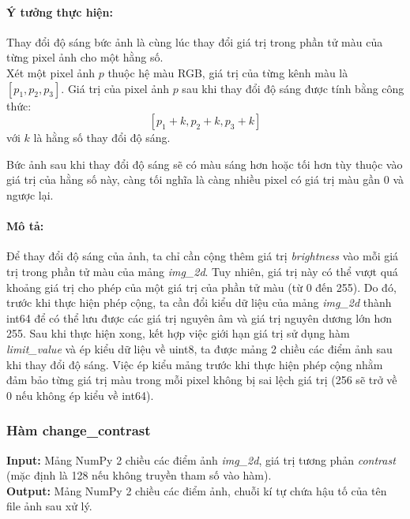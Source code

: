 \documentclass{article}
\begin{document}
\paragraph{Ý tưởng thực hiện:} Thay đổi độ sáng bức ảnh là cùng lúc thay đổi giá trị trong phần tử màu của từng pixel ảnh cho một hằng số. \\
Xét một pixel ảnh $p$ thuộc hệ màu RGB, giá trị của từng kênh màu là $[p_{1}, p_{2}, p_{3}]$. Giá trị của pixel ảnh $p$ sau khi thay đổi độ sáng được tính bằng công thức: 
\[[p_{1} + k , p_{2} + k, p_{3} + k]\]
với $k$ là hằng số thay đổi độ sáng. \par Bức ảnh sau khi thay đổi độ sáng sẽ có màu sáng hơn hoặc tối hơn tùy thuộc vào giá trị của hằng số này, càng tối nghĩa là càng nhiều pixel có giá trị màu gần 0 và ngược lại.

\paragraph{Mô tả:} Để thay đổi độ sáng của ảnh, ta chỉ cần cộng thêm giá trị \textit{brightness} vào mỗi giá trị trong phần tử màu của mảng \textit{img\_2d}. Tuy nhiên, giá trị này có thể vượt quá khoảng giá trị cho phép của một giá trị của phần tử màu (từ 0 đến 255). Do đó, trước khi thực hiện phép cộng, ta cần đổi kiểu dữ liệu của mảng \textit{img\_2d} thành int64 để có thể lưu được các giá trị nguyên âm và giá trị nguyên dương lớn hơn 255. Sau khi thực hiện xong, kết hợp việc giới hạn giá trị sử dụng hàm \textit{limit\_value} và ép kiểu dữ liệu về uint8, ta được mảng 2 chiều các điểm ảnh sau khi thay đổi độ sáng. Việc ép kiểu mảng trước khi thực hiện phép cộng nhằm đảm bảo từng giá trị màu trong mỗi pixel không bị sai lệch giá trị (256 sẽ trở về 0 nếu không ép kiểu về int64).

\subsubsection{Hàm change\_contrast}
\textbf{Input:} Mảng NumPy 2 chiều các điểm ảnh \textit{img\_2d}, giá trị tương phản \textit{contrast} (mặc định là 128 nếu không truyền tham số vào hàm). \\
\textbf{Output:} Mảng NumPy 2 chiều các điểm ảnh, chuỗi kí tự chứa hậu tố của tên file ảnh sau xử lý.
\end{document}

